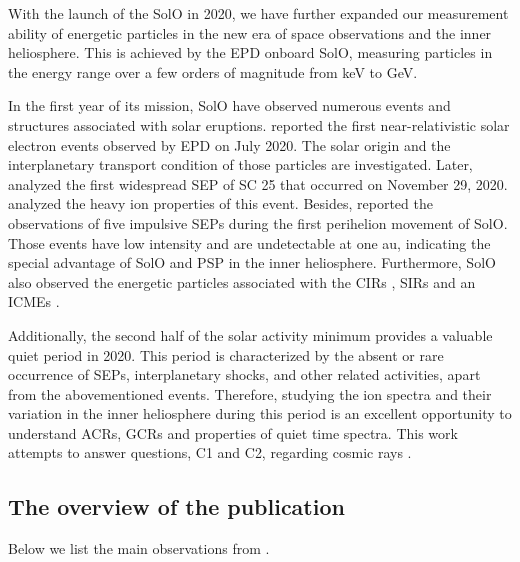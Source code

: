 With the launch of the \ac{SolO} in 2020, we have further expanded our measurement ability of energetic particles in the new era of space observations and the inner heliosphere. This is achieved by the \ac{EPD} onboard \ac{SolO}, measuring particles in the energy range over a few orders of magnitude from keV to GeV.

In the first year of its mission, \ac{SolO} have observed numerous events and structures associated with solar eruptions. \citet{GomezHerrero-2021-SolO} reported the first near-relativistic solar electron events observed by \ac{EPD} on July 2020. The solar origin and the interplanetary transport condition of those particles are investigated. Later, \citet{Kolhoff2021AA} analyzed the first widespread \ac{SEP} of \ac{SC} 25 that occurred on November 29, 2020. \citet{Mason2021AA} analyzed the heavy ion properties of this event. Besides, \citet{Mason2021AA_he3rich} reported the observations of five impulsive \acp{SEP} during the first perihelion movement of \ac{SolO}. Those events have low intensity and are undetectable at one au, indicating the special advantage of \ac{SolO} and \acs{PSP} in the inner heliosphere. Furthermore, \ac{SolO} also observed the energetic particles associated with the \acp{CIR} \citep{Allen2021AA_suprathermal}, \acp{SIR} \citep{Aran2021AA} and an \acp{ICME} \citep{Kilpua2021AA}.


Additionally, the second half of the solar activity minimum provides a valuable quiet period in 2020. This period is characterized by the absent or rare occurrence of \acp{SEP}, interplanetary shocks, and other related activities, apart from the abovementioned events. Therefore, studying the ion spectra and their variation in the inner heliosphere during this period is an excellent opportunity to understand \acp{ACR}, \acp{GCR} and properties of quiet time spectra. 
This work attempts to answer questions, C1 and C2, regarding cosmic rays .\\

\subsection*{The overview of the publication}

Below we list the main observations from \citet{Mason-2021-SolOQuietTime}.

